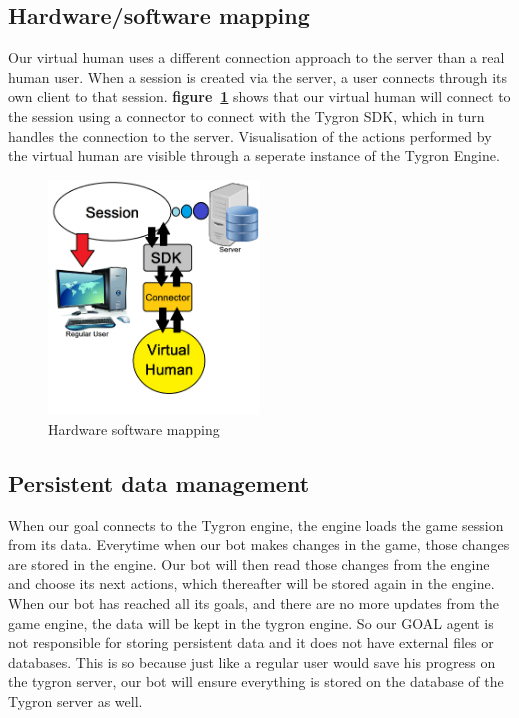 \subsection{Hardware/software mapping}
Our virtual human uses a different connection approach to the server than a real human user. When a session is created via the server, a user connects through its own client to that session. \textbf{figure~\ref{fig:Hard_soft_map}} shows that our virtual human will connect to the session using a connector to connect with the Tygron SDK, which in turn handles the connection to the server. Visualisation of the actions performed by the virtual human are visible through a seperate instance of the Tygron Engine.

\begin{figure}
	\centering
	\includegraphics[width=0.5\textwidth]{Hardware_software_mapping}
	\caption{Hardware software mapping}
	\label{fig:Hard_soft_map}
\end{figure}

\subsection{Persistent data management}
When our goal connects to the Tygron engine, the engine loads the game session from its data. Everytime when our bot makes changes in the game, those changes are stored in the engine. Our bot will then read those changes from the engine and choose its next actions, which thereafter will be stored again in the engine. When our bot has reached all its goals, and there are no more updates from the game engine, the data will be kept in the tygron engine. So our GOAL agent is not responsible for storing persistent data and it does not have external files or databases. This is so because just like a regular user would save his progress on the tygron server, our bot will ensure everything is stored on the database of the Tygron server as well.

